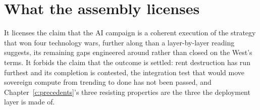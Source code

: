 \section{What the assembly licenses}

It licenses the claim that the AI campaign is a coherent execution of the strategy that won four technology wars, further along than a layer-by-layer reading suggests, its remaining gaps engineered around rather than closed on the West's terms. It forbids the claim that the outcome is settled: rent destruction has run furthest and its completion is contested, the integration test that would move sovereign compute from trending to done has not been passed, and Chapter~\ref{c:precedents}'s three resisting properties are the three the deployment layer is made of.
